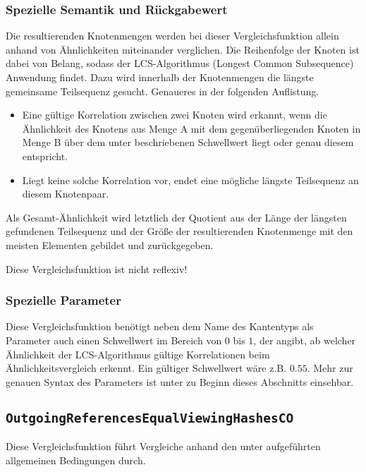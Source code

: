 \subsubsection*{Spezielle Semantik und Rückgabewert}
Die resultierenden Knotenmengen werden bei dieser Vergleichsfunktion allein anhand von Ähnlichkeiten miteinander verglichen. Die Reihenfolge der Knoten ist dabei von Belang, sodass der LCS-Algorithmus (Longest Common Subsequence) Anwendung findet. Dazu wird innerhalb der Knotenmengen die längste gemeinsame Teilsequenz gesucht. Genaueres in der folgenden Auflistung.
\begin{itemize}
	\item Eine gültige Korrelation zwischen zwei Knoten wird erkannt, wenn die Ähnlichkeit des Knotens aus Menge A mit dem gegenüberliegenden Knoten in Menge B über dem unter  beschriebenen Schwellwert liegt oder genau diesem entspricht.
	\item Liegt keine solche Korrelation vor, endet eine mögliche längste Teilsequenz an diesem Knotenpaar.
\end{itemize}

Als Gesamt-Ähnlichkeit wird letztlich der Quotient aus der Länge der längsten gefundenen Teilsequenz und der Größe der resultierenden Knotenmenge mit den meisten Elementen gebildet und zurückgegeben.

 Diese Vergleichsfunktion ist nicht reflexiv!

\subsubsection*{Spezielle Parameter}
Diese Vergleichsfunktion benötigt neben dem Name des Kantentyps als Parameter auch einen Schwellwert im Bereich von $0$ bis $1$, der angibt, ab welcher Ähnlichkeit der LCS-Algorithmus gültige Korrelationen beim Ähnlichkeitsvergleich erkennt. Ein gültiger Schwellwert wäre z.B. $0.55$. Mehr zur genauen Syntax des Parameters ist unter  zu Beginn dieses Abschnitts einsehbar.


\newpage
%
%
\subsection{\texttt{OutgoingReferencesEqualViewingHashesCO}}
Diese Vergleichsfunktion führt Vergleiche anhand den unter\mylinebreak{} aufgeführten allgemeinen Bedingungen durch.

